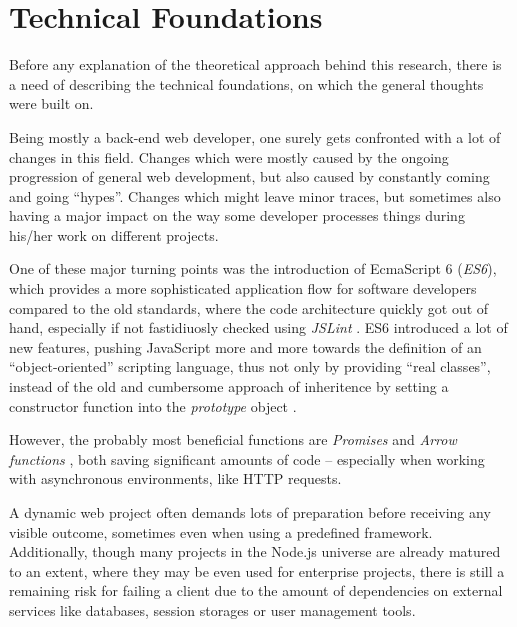\chapter{Technical Foundations}
\label{cha:technicalfoundations}

Before any explanation of the theoretical approach behind this research, there is a need of describing the technical foundations, on which the general thoughts were built on.

Being mostly a back-end web developer, one surely gets confronted with a lot of changes in this field. Changes which were mostly caused by the ongoing progression of general web development, but also caused by constantly coming and going ``hypes''. Changes which might leave minor traces, but sometimes also having a major impact on the way some developer processes things during his/her work on different projects.

One of these major turning points was the introduction of EcmaScript 6 (\emph{ES6}), which provides a more sophisticated application flow for software developers compared to the old standards, where the code architecture quickly got out of hand, especially if not fastidiuosly checked using \emph{JSLint} \cite{JSLintDocumentation}. ES6 introduced a lot of new features, pushing JavaScript more and more towards the definition of an ``object-oriented'' scripting language, thus not only by providing ``real classes'', instead of the old and cumbersome approach of inheritence by setting a constructor function into the \emph{prototype} object \cite[47]{crockford2008javascript}.

However, the probably most beneficial functions are \emph{Promises} \cite{MDNPromise} and \emph{Arrow functions} \cite{MDNArrowFunctions}, both saving significant amounts of code -- especially when working with asynchronous environments, like HTTP requests.

A dynamic web project often demands lots of preparation before receiving any visible outcome, sometimes even when using a predefined framework. Additionally, though many projects in the Node.js universe are already matured to an extent, where they may be even used for enterprise projects, there is still a remaining risk for failing a client due to the amount of dependencies on external services like databases, session storages or user management tools.

